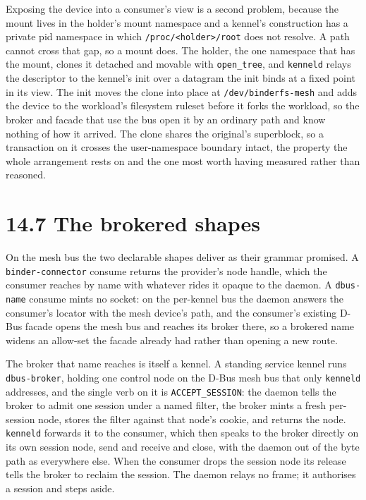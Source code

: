 Exposing the device into a consumer's view is a second problem, because
the mount lives in the holder's mount namespace and a kennel's
construction has a private pid namespace in which
\texttt{/proc/\textless{}holder\textgreater{}/root} does not resolve. A
path cannot cross that gap, so a mount does. The holder, the one
namespace that has the mount, clones it detached and movable with
\texttt{open\_tree}, and \texttt{kenneld} relays the descriptor to the
kennel's init over a datagram the init binds at a fixed point in its
view. The init moves the clone into place at \texttt{/dev/binderfs-mesh}
and adds the device to the workload's filesystem ruleset before it forks
the workload, so the broker and facade that use the bus open it by an
ordinary path and know nothing of how it arrived. The clone shares the
original's superblock, so a transaction on it crosses the user-namespace
boundary intact, the property the whole arrangement rests on and the one
most worth having measured rather than reasoned.

\hypertarget{the-brokered-shapes}{%
\section{14.7 The brokered shapes}\label{the-brokered-shapes}}

On the mesh bus the two declarable shapes deliver as their grammar
promised. A \texttt{binder-connector} consume returns the provider's
node handle, which the consumer reaches by name with whatever rides it
opaque to the daemon. A \texttt{dbus-name} consume mints no socket: on
the per-kennel bus the daemon answers the consumer's locator with the
mesh device's path, and the consumer's existing D-Bus facade opens the
mesh bus and reaches its broker there, so a brokered name widens an
allow-set the facade already had rather than opening a new route.

The broker that name reaches is itself a kennel. A standing service
kennel runs \texttt{dbus-broker}, holding one control node on the D-Bus
mesh bus that only \texttt{kenneld} addresses, and the single verb on it
is \texttt{ACCEPT\_SESSION}: the daemon tells the broker to admit one
session under a named filter, the broker mints a fresh per-session node,
stores the filter against that node's cookie, and returns the node.
\texttt{kenneld} forwards it to the consumer, which then speaks to the
broker directly on its own session node, send and receive and close,
with the daemon out of the byte path as everywhere else. When the
consumer drops the session node its release tells the broker to reclaim
the session. The daemon relays no frame; it authorises a session and
steps aside.

